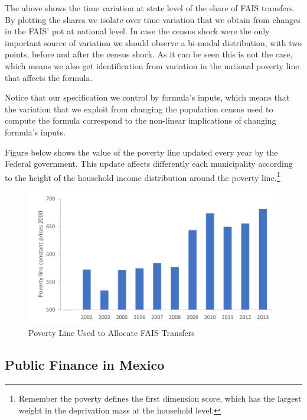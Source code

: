 \documentclass[dv_diss_main.tex]{subfiles}
\begin{document}
The above shows the time variation at state level of the share of FAIS transfers. By plotting the shares we isolate over time variation that we obtain from changes in the FAIS' pot at national level. In case the census shock were the only important source of variation we should observe a bi-modal distribution, with two points, before and after the census shock. As it can be seen this is not the case, which means we also get identification from variation in the national poverty line that affects the formula.

Notice that our specification we control by formula's inputs, which means that the variation that we exploit from changing the population census used to compute the formula correspond to the non-linear implications of changing formula's inputs. 

Figure below shows the value of the poverty line updated every year by the Federal government. This update affects differently each municipality according to the height of the household income distribution around the poverty line.\footnote{ Remember the poverty defines the first dimension score, which has the largest weight in the deprivation mass at the household level.} 

\begin{figure}[H] 
	\centering 
	
		\centering
		\includegraphics[width=\linewidth]{figures/Poverty_line.png}
		\vspace{0.1cm}
		\caption{Poverty Line Used to Allocate FAIS Transfers}\label{fig:B2}
		
		\parbox{\textwidth}{\small 
		\vspace{2eX}
		\footnotesize	
		\povertylineformula 
		}
	
\end{figure}

\subsection{Public Finance in Mexico}
    
\end{document}
